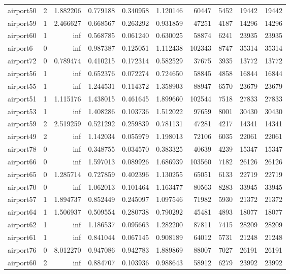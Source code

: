 \begin{longtable}{|l|r|r|r|r|r|r|r|r|r|}
airport50 & 2 & 1.882206 & 0.779188 & 0.340958 & 1.120146 & 60447 & 5452 & 19442 & 19442 \\
airport59 & 1 & 2.466627 & 0.668567 & 0.263292 & 0.931859 & 47251 & 4187 & 14296 & 14296 \\
airport60 & 1 & inf & 0.568785 & 0.061240 & 0.630025 & 58874 & 6241 & 23935 & 23935 \\
airport6 & 0 & inf & 0.987387 & 0.125051 & 1.112438 & 102343 & 8747 & 35314 & 35314 \\
airport72 & 0 & 0.789474 & 0.410215 & 0.172314 & 0.582529 & 37675 & 3935 & 13772 & 13772 \\
airport56 & 1 & inf & 0.652376 & 0.072274 & 0.724650 & 58845 & 4858 & 16844 & 16844 \\
airport55 & 1 & inf & 1.244531 & 0.114372 & 1.358903 & 88947 & 6570 & 23679 & 23679 \\
airport51 & 1 & 1.115176 & 1.438015 & 0.461645 & 1.899660 & 102544 & 7518 & 27833 & 27833 \\
airport53 & 1 & inf & 1.408286 & 0.103736 & 1.512022 & 97659 & 8001 & 30430 & 30430 \\
airport59 & 2 & 2.519259 & 0.521292 & 0.259839 & 0.781131 & 47281 & 4217 & 14341 & 14341 \\
airport49 & 2 & inf & 1.142034 & 0.055979 & 1.198013 & 72106 & 6035 & 22061 & 22061 \\
airport78 & 0 & inf & 0.348755 & 0.034570 & 0.383325 & 40639 & 4239 & 15347 & 15347 \\
airport66 & 0 & inf & 1.597013 & 0.089926 & 1.686939 & 103560 & 7182 & 26126 & 26126 \\
airport65 & 0 & 1.285714 & 0.727859 & 0.402396 & 1.130255 & 65051 & 6133 & 22719 & 22719 \\
airport70 & 0 & inf & 1.062013 & 0.101464 & 1.163477 & 80563 & 8283 & 33945 & 33945 \\
airport57 & 1 & 1.894737 & 0.852449 & 0.245097 & 1.097546 & 71982 & 5930 & 21372 & 21372 \\
airport64 & 1 & 1.506937 & 0.509554 & 0.280738 & 0.790292 & 45481 & 4893 & 18077 & 18077 \\
airport62 & 1 & inf & 1.186537 & 0.095663 & 1.282200 & 87811 & 7415 & 28209 & 28209 \\
airport61 & 1 & inf & 0.841044 & 0.067145 & 0.908189 & 64012 & 5731 & 21248 & 21248 \\
airport76 & 0 & 8.012270 & 0.947086 & 0.942783 & 1.889869 & 88007 & 7027 & 26191 & 26191 \\
airport60 & 2 & inf & 0.884707 & 0.103936 & 0.988643 & 58912 & 6279 & 23992 & 23992 \\

\end{longtable}
